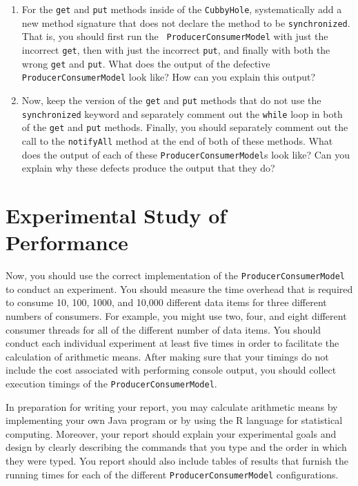 \begin{enumerate}

  \item For the {\tt get} and {\tt put} methods inside of the {\tt CubbyHole}, systematically add a new method signature
    that does not declare the method to be {\tt synchronized}.  That is, you should first run the {\tt
      ProducerConsumerModel} with just the incorrect {\tt get}, then with just the incorrect {\tt put}, and finally with
    both the wrong {\tt get} and {\tt put}.   What does the output of the defective {\tt ProducerConsumerModel} look
    like?  How can you explain this output?  

  \item Now, keep the version of the {\tt get} and {\tt put} methods that do not use the {\tt synchronized} keyword and
    separately comment out the {\tt while} loop in both of the {\tt get} and {\tt put} methods.  Finally, you should
    separately comment out the call to the {\tt notifyAll} method at the end of both of these methods.  What does the
    output of each of these {\tt ProducerConsumerModel}s look like? Can you explain why these defects produce the output
    that they do?

\end{enumerate}

\section*{Experimental Study of Performance}

Now, you should use the correct implementation of the {\tt ProducerConsumerModel} to conduct an experiment.  You should
measure the time overhead that is required to consume 10, 100, 1000, and 10,000 different data items for three different
numbers of consumers.  For example, you might use two, four, and eight different consumer threads for all of the
different number of data items.  You should conduct each individual experiment at least five times in order to
facilitate the calculation of arithmetic means.  After making sure that your timings do not include the cost associated
with performing console output, you should collect execution timings of the {\tt ProducerConsumerModel}.  

In preparation for writing your report, you may calculate arithmetic means by implementing your own Java program or by
using the R language for statistical computing.  Moreover, your report should explain your experimental goals and design
by clearly describing the commands that you type and the order in which they were typed.  You report should also include
tables of results that furnish the running times for each of the different {\tt ProducerConsumerModel} configurations.  

